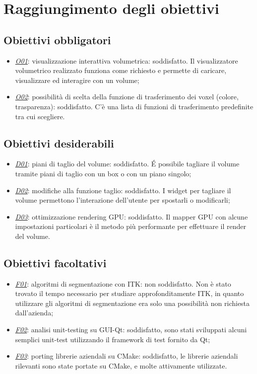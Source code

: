 \section{Raggiungimento degli obiettivi}
\subsection{Obiettivi obbligatori}
\begin{itemize}
\item \underline{\textit{O01}}: visualizzazione interattiva volumetrica: soddisfatto. Il visualizzatore volumetrico realizzato funziona come richiesto e permette di caricare, visualizzare ed interagire con un volume;
\item \underline{\textit{O02}}: possibilità di scelta della funzione di trasferimento dei voxel (colore, trasparenza): soddisfatto. C'è una lista di funzioni di trasferimento predefinite tra cui scegliere.
\end{itemize}

\subsection{Obiettivi desiderabili}
\begin{itemize}
\item \underline{\textit{D01}}: piani di taglio del volume: soddisfatto. \'E possibile tagliare il volume tramite piani di taglio con un box o con un piano singolo;
\item \underline{\textit{D02}}: modifiche alla funzione taglio: soddisfatto. I widget per tagliare il volume permettono l'interazione dell'utente per spostarli o modificarli;
\item \underline{\textit{D03}}: ottimizzazione rendering GPU: soddisfatto. Il mapper GPU con alcune impostazioni particolari è il metodo più performante per effettuare il render del volume.
\end{itemize}

\subsection{Obiettivi facoltativi}
\begin{itemize}
	 \item \underline{\textit{F01}}: algoritmi di segmentazione con ITK: non soddisfatto. Non è stato trovato il tempo necessario per studiare approfonditamente ITK, in quanto utilizzare gli algoritmi di segmentazione era solo una possibilità non richiesta dall'azienda;
	 \item \underline{\textit{F02}}: analisi unit-testing su GUI-Qt: soddisfatto, sono stati sviluppati alcuni semplici unit-test utilizzando il framework di test fornito da Qt;
	 \item \underline{\textit{F03}}: porting librerie aziendali su CMake: soddisfatto, le librerie aziendali rilevanti sono state portate su CMake, e molte attivamente utilizzate.
\end{itemize}

